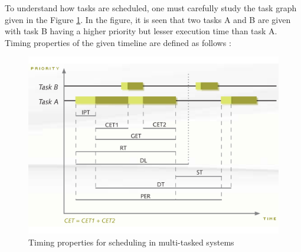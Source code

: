 To understand how tasks are scheduled, one must carefully study the task graph given in the Figure \ref{fig:scheduling}. In the figure, it is seen that two tasks A and B are given with task B having a higher priority but lesser execution time than task A. Timing properties of the given timeline are defined as follows \cite{timingposter} \cite{lukas1}:
\begin{figure}[!ht]
	\centering
	\captionsetup{justification=centering}
	\includegraphics[width=\textwidth]{content/images/scheduling.pdf}
	\caption{Timing properties for scheduling in multi-tasked systems \cite{timingposter}}
	\label{fig:scheduling}
\end{figure}
